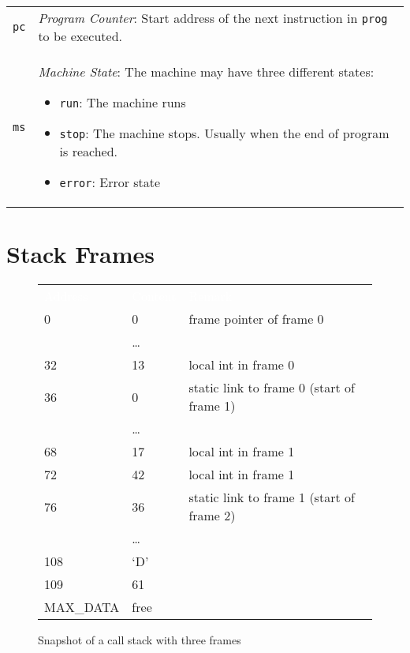 \begin{tabular}{p{}p{}}		
	\lstinline$pc$ & {\em Program Counter}: Start address of the next instruction in \lstinline$prog$ to be executed.\\
	\lstinline$ms$ & {\em Machine State}: The \leongage{} machine may have three different states:
	\begin{itemize}
		\item \lstinline$run$: The machine runs
		\item \lstinline$stop$: The machine stops. Usually when the end of program is reached.
		\item \lstinline$error$: Error state
	\end{itemize}
\end{tabular}

\section{Stack Frames}\label{sec:stackframes}
\begin{figure}
\begin{center}
\begin{tabular}{p{8em}|p{4em}|p{15em}}
\parbox[b][1em][b]{8em}{\hfill {}\textcolor{White}{Address}} & \textcolor{White}{Content} & \textcolor{White}{Remark} \\  
\parbox[t][1em][t]{5em}{\hfill 0} & 0 & frame pointer of frame 0 \\ 
& \ldots \\ 
\parbox[t][1em][t]{5em}{\hfill 32} & 13 & local int in frame 0 \\ 
\parbox[t][1em][t]{5em}{\hfill 36} & 0 & static link to frame 0 (start of frame 1)\\ 
& \ldots \\ 
\parbox[t][1em][t]{5em}{\hfill 68} & 17 & local int in frame 1\\ 
\parbox[t][1em][t]{5em}{\hfill 72} & 42 & local int in frame 1\\ 
\parbox[t][1em][t]{5em}{\hfill 76} & 36 & static link to frame 1 (start of frame 2) \\ 
& \ldots \\ 
\parbox[t][1em][t]{5em}{\hfill 108} & `D' \\ 
\parbox[t][1em][t]{5em}{\hfill 109} & 61 \\ 
\parbox[b][4em][b]{8em}{\hfill MAX\_DATA} & free \\ 
\end{tabular}
\end{center}
\caption{Snapshot of a call stack with three frames}\label{fig:threeframes}
\end{figure}

